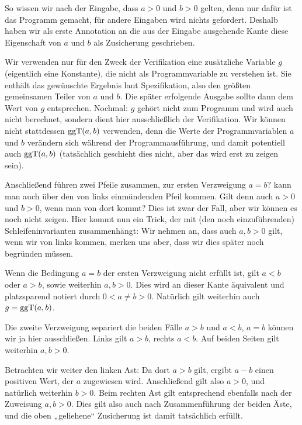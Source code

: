So wissen wir nach der Eingabe, dass $a > 0$ und $b > 0$ gelten, denn nur dafür ist das Programm gemacht, für andere Eingaben wird nichts gefordert. Deshalb haben wir als erste Annotation an die aus der Eingabe ausgehende Kante diese Eigenschaft von $a$ und $b$ als Zusicherung geschrieben.

Wir verwenden nur für den Zweck der Verifikation eine zusätzliche Variable $g$ (eigentlich eine Konstante), die nicht als Programmvariable zu verstehen ist. Sie enthält das gewünschte Ergebnis laut Spezifikation, also den größten gemeinsamen Teiler von $a$ und $b$. Die später erfolgende Ausgabe sollte dann dem Wert von $g$ entsprechen. Nochmal: $g$ gehört nicht zum Programm und wird auch nicht berechnet, sondern dient hier ausschließlich der Verifikation. Wir können nicht stattdessen ${\text{ggT}}(a,b)$ verwenden, denn die Werte der Programmvariablen $a$ und $b$ verändern sich während der Programmausführung, und damit potentiell auch ${\text{ggT}}(a,b)$ (tatsächlich geschieht dies nicht, aber das wird erst zu zeigen sein).

\vspace{1.7mm} %

Anschließend führen zwei Pfeile zusammen, zur ersten Verzweigung $a=b? $ kann man auch über den von links einmündenden Pfeil kommen. Gilt denn auch $a > 0$ und $b > 0$, wenn man von dort kommt? Dies ist zwar der Fall, aber wir können es noch nicht zeigen. Hier kommt nun ein Trick, der mit (den noch einzuführenden) Schleifeninvarianten zusammenhängt: Wir nehmen an, dass auch $a,b > 0$ gilt, wenn wir von links kommen, merken uns aber, dass wir dies später noch begründen müssen.

\vspace{1.7mm} %

Wenn die Bedingung $a = b$ der ersten Verzweigung nicht erfüllt ist, gilt $a < b$ oder $a > b$, sowie weiterhin $a,b >0$. Dies wird an dieser Kante äquivalent und platz\-sparend notiert durch $0<a\neq b >0$. Natürlich gilt weiterhin auch $g = {\text{ggT}}(a,b)$.

\vspace{1.7mm} %

Die zweite Verzweigung separiert die beiden Fälle $a>b $ und $a<b$, $a=b$ können wir ja hier ausschließen. Links gilt $a > b$, rechts $a < b$. Auf beiden Seiten gilt weiterhin $a,b > 0$.

\vspace{1.7mm} %

Betrachten wir weiter den linken Ast: Da dort $a > b$ gilt, ergibt $a - b$ einen positiven Wert, der $a$ zugewiesen wird. Anschließend gilt also $a > 0$, und natürlich weiterhin $b > 0$. Beim rechten Ast gilt entsprechend ebenfalls nach der Zuweisung $a,b > 0$. Dies gilt also auch nach Zusammenführung der beiden Äste, und die oben „geliehene“ Zusicherung ist damit tatsächlich erfüllt.

